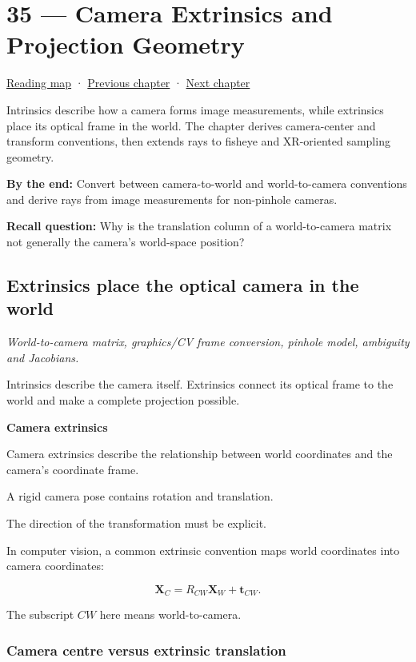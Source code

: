 \hypertarget{02-foundations-ii-ch035}{}
\chapter{35 --- Camera Extrinsics and Projection Geometry}\label{02-foundations-ii-ch035-camera-extrinsics-and-projection-geometry}

\hyperref[volume-reading-map]{Reading map} · \hyperref[02-foundations-ii-ch034]{Previous chapter} · \hyperref[02-foundations-ii-ch036]{Next chapter}

Intrinsics describe how a camera forms image measurements, while extrinsics place its optical frame in the world. The chapter derives camera-center and transform conventions, then extends rays to fisheye and XR-oriented sampling geometry.

\textbf{By the end:} Convert between camera-to-world and world-to-camera conventions and derive rays from image measurements for non-pinhole cameras.

\textbf{Recall question:} Why is the translation column of a world-to-camera matrix not generally the camera's world-space position?

\section{Extrinsics place the optical camera in the world}\label{02-foundations-ii-ch035-extrinsics-place-the-optical-camera-in-the-world}

\emph{World-to-camera matrix, graphics/CV frame conversion, pinhole model, ambiguity and Jacobians.}

Intrinsics describe the camera itself. Extrinsics connect its optical frame to the world and make a complete projection possible.

\textbf{Camera extrinsics}

Camera extrinsics describe the relationship between world coordinates and the camera's coordinate frame.

A rigid camera pose contains rotation and translation.

The direction of the transformation must be explicit.

In computer vision, a common extrinsic convention maps world coordinates into camera coordinates:

\[
 \boxed{ \mathbf X_C=R_{CW}\mathbf X_W+\mathbf t_{CW} }.
\]

The subscript \(CW\) here means world-to-camera.

\subsection{Camera centre versus extrinsic translation}\label{02-foundations-ii-ch035-camera-centre-versus-extrinsic-translation}

